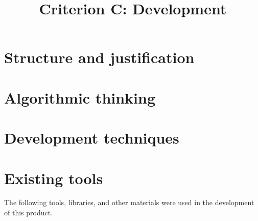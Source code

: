 

\title{Criterion C: Development}


\maketitle


\section{Structure and justification}

\section{Algorithmic thinking}

\section{Development techniques}

\section{Existing tools}

The following tools, libraries, and other materials were used in the
development of this product.

